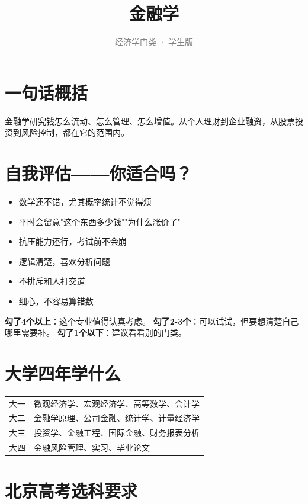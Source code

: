 \documentclass[a4paper,12pt]{ctexart}
\title{\textcolor{blue!70!black}{\Huge\textbf{金融学}}}
\subtitle{\textcolor{gray}{经济学门类 · 学生版}}
\author{}
\date{}
\begin{document}
\maketitle
\thispagestyle{empty}

\section{一句话概括}

金融学研究钱怎么流动、怎么管理、怎么增值。从个人理财到企业融资，从股票投资到风险控制，都在它的范围内。

\section{自我评估——你适合吗？}

\begin{itemize}
  \item[\textbf{☐}] 数学还不错，尤其概率统计不觉得烦
  \item[\textbf{☐}] 平时会留意"这个东西多少钱""为什么涨价了"
  \item[\textbf{☐}] 抗压能力还行，考试前不会崩
  \item[\textbf{☐}] 逻辑清楚，喜欢分析问题
  \item[\textbf{☐}] 不排斥和人打交道
  \item[\textbf{☐}] 细心，不容易算错数
\end{itemize}

\textbf{勾了4个以上}：这个专业值得认真考虑。
\textbf{勾了2-3个}：可以试试，但要想清楚自己哪里需要补。
\textbf{勾了1个以下}：建议看看别的门类。

\section{大学四年学什么}

\begin{tabular}{ll}
\toprule
大一 & 微观经济学、宏观经济学、高等数学、会计学 \\
大二 & 金融学原理、公司金融、统计学、计量经济学 \\
大三 & 投资学、金融工程、国际金融、财务报表分析 \\
大四 & 金融风险管理、实习、毕业论文 \\
\bottomrule
\end{tabular}

\section{北京高考选科要求}
\end{document}
